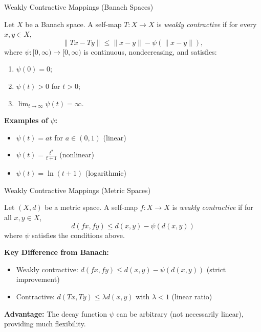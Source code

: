 \documentclass[aspectratio=169,10pt]{beamer}
\begin{document}
\begin{frame}{Weakly Contractive Mappings (Banach Spaces)}
  \begin{definition}
    Let $X$ be a Banach space. A self-map $T : X \to X$ is \emph{weakly contractive} if
    for every $x, y \in X$,
    \[
      \|Tx - Ty\| \leq \|x - y\| - \psi(\|x - y\|),
    \]
    where $\psi : [0,\infty) \to [0,\infty)$ is continuous, nondecreasing, and satisfies:
    \begin{enumerate}
      \item $\psi(0) = 0$;
      \item $\psi(t) > 0$ for $t > 0$;
      \item $\lim_{t \to \infty} \psi(t) = \infty$.
    \end{enumerate}
  \end{definition}

  \vspace{0.2cm}

  \textbf{Examples of } $\psi$\textbf{:}
  \begin{itemize}
    \item $\psi(t) = at$ for $a \in (0,1)$ (linear)
    \item $\psi(t) = \frac{t^2}{t+1}$ (nonlinear)
    \item $\psi(t) = \ln(t+1)$ (logarithmic)
  \end{itemize}
\end{frame}

\begin{frame}{Weakly Contractive Mappings (Metric Spaces)}
  \begin{definition}
    Let $(X, d)$ be a metric space. A self-map $f : X \to X$ is \emph{weakly contractive}
    if for all $x, y \in X$,
    \[
      d(fx, fy) \leq d(x,y) - \psi(d(x,y))
    \]
    where $\psi$ satisfies the conditions above.
  \end{definition}

  \vspace{0.3cm}

  \textbf{Key Difference from Banach:}
  \begin{itemize}
    \item Weakly contractive: $d(fx,fy) \leq d(x,y) - \psi(d(x,y))$ (strict improvement)
    \item Contractive: $d(Tx,Ty) \leq \lambda d(x,y)$ with $\lambda < 1$ (linear ratio)
  \end{itemize}

  \vspace{0.3cm}

  \textbf{Advantage:} The decay function $\psi$ can be arbitrary (not necessarily linear),
  providing much flexibility.
\end{frame}
\end{document}
